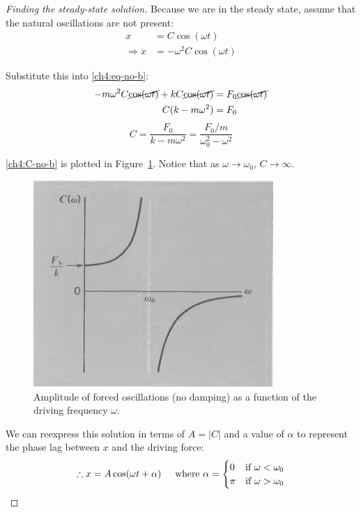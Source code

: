\begin{proof}[Finding the steady-state solution]
Because we are in the steady state, assume that the natural oscillations are not present:
\begin{align*}
	x &= C\cos(\omega t) \\
	\Longrightarrow
	\ddot{x} &= -\omega^2 C\cos(\omega t)
\end{align*}

Substitute this into \eqref{ch4:eq-no-b}:
\begin{align*}
	-m\omega^2 C\cancel{\cos(\omega t)} + kC\cancel{\cos(\omega t)} &= F_0\cancel {\cos(\omega t)} \\
	C(k-m\omega^2) &= F_0
\end{align*}
\begin{equation}
	 C = \frac{F_0}{k-m\omega^2} = \frac{F_0/m}{\omega_0^2-\omega^2} \label{ch4:C-no-b}
\end{equation}

\eqref{ch4:C-no-b} is plotted in Figure~\ref{ch4:no-damping-C}. Notice that as $\omega\to\omega_0$, $C\to \infty$.
\begin{figure}
	\centering
	\includegraphics[scale=0.7]{phys232/Ch4-forced-no-damping-C.png} \caption{Amplitude of forced oscillations (no damping) as a function of the driving frequency $\omega$.}\label{ch4:no-damping-C}
\end{figure}

We can reexpress this solution in terms of $A=|C|$ and a value of $\alpha$ to represent the phase lag between $x$ and the driving force:
\begin{equation}
	\therefore
	x = A \cos(\omega t + \alpha)  \hspace{0.5cm}\text{where } \alpha = 
	\begin{cases}
		0 & \text{if } \omega<\omega_0 \\
		\pi & \text{if } \omega>\omega_0
	\end{cases}
	\label{ch4:A-no-b}
\end{equation}


\end{proof}
